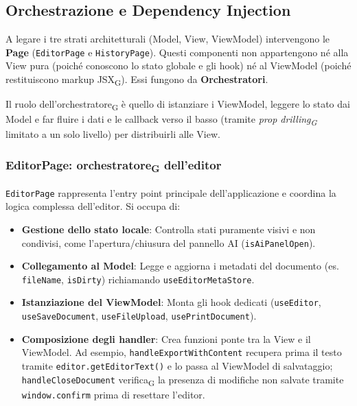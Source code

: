\documentclass[11pt,a4paper]{article}
\newcommand{\gls}[1]{#1\textsubscript{G}}
\begin{document}
\newpage

\subsection{Orchestrazione e Dependency Injection}
A legare i tre strati architetturali (Model, View, ViewModel) intervengono le \textbf{Page} (\texttt{EditorPage} e \texttt{HistoryPage}). Questi componenti non appartengono né alla View pura (poiché conoscono lo stato globale e gli hook) né al ViewModel (poiché restituiscono markup \gls{JSX}). Essi fungono da \textbf{Orchestratori}.

Il ruolo dell'\gls{orchestratore} è quello di istanziare i ViewModel, leggere lo stato dai Model e far fluire i dati e le callback verso il basso (tramite \textit{\gls{prop drilling}} limitato a un solo livello) per distribuirli alle View.

\subsubsection{EditorPage: \gls{orchestratore} dell'editor}
\texttt{EditorPage} rappresenta l'entry point principale dell'applicazione e coordina la logica complessa dell'editor. Si occupa di:
\begin{itemize}
    \item \textbf{Gestione dello stato locale}: Controlla stati puramente visivi e non condivisi, come l'apertura/chiusura del pannello AI (\texttt{isAiPanelOpen}).
    \item \textbf{Collegamento al Model}: Legge e aggiorna i metadati del documento (es. \texttt{fileName}, \texttt{isDirty}) richiamando \texttt{useEditorMetaStore}.
    \item \textbf{Istanziazione del ViewModel}: Monta gli hook dedicati (\texttt{useEditor}, \texttt{useSaveDocument}, \texttt{useFileUpload}, \texttt{usePrintDocument}).
    \item \textbf{Composizione degli handler}: Crea funzioni ponte tra la View e il ViewModel. Ad esempio, \texttt{handleExportWithContent} recupera prima il testo tramite \texttt{editor.getEditorText()} e lo passa al ViewModel di salvataggio; \texttt{handleCloseDocument} \gls{verifica} la presenza di modifiche non salvate tramite \texttt{window.confirm} prima di resettare l'editor.
\end{itemize}
\end{document}
